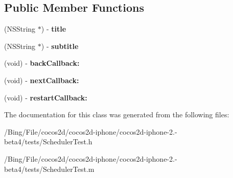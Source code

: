 \subsection*{Public Member Functions}
\begin{DoxyCompactItemize}
\item 
\hypertarget{interface_scheduler_test_aabbb968c6a8bc9c5c11ff99d73b4b0ab}{(N\-S\-String $\ast$) -\/ {\bfseries title}}\label{interface_scheduler_test_aabbb968c6a8bc9c5c11ff99d73b4b0ab}

\item 
\hypertarget{interface_scheduler_test_af3823d094f4a58d7d246365d0845bb3d}{(N\-S\-String $\ast$) -\/ {\bfseries subtitle}}\label{interface_scheduler_test_af3823d094f4a58d7d246365d0845bb3d}

\item 
\hypertarget{interface_scheduler_test_a55277727926c9a614cd544c8c8a390ec}{(void) -\/ {\bfseries back\-Callback\-:}}\label{interface_scheduler_test_a55277727926c9a614cd544c8c8a390ec}

\item 
\hypertarget{interface_scheduler_test_ae4f7a21ff0bb531cbb765f9d9c5111e3}{(void) -\/ {\bfseries next\-Callback\-:}}\label{interface_scheduler_test_ae4f7a21ff0bb531cbb765f9d9c5111e3}

\item 
\hypertarget{interface_scheduler_test_a278daaee1c62473d8c2417482b69b086}{(void) -\/ {\bfseries restart\-Callback\-:}}\label{interface_scheduler_test_a278daaee1c62473d8c2417482b69b086}

\end{DoxyCompactItemize}


The documentation for this class was generated from the following files\-:\begin{DoxyCompactItemize}
\item 
/\-Bing/\-File/cocos2d/cocos2d-\/iphone/cocos2d-\/iphone-\/2.-\/beta4/tests/Scheduler\-Test.\-h\item 
/\-Bing/\-File/cocos2d/cocos2d-\/iphone/cocos2d-\/iphone-\/2.-\/beta4/tests/Scheduler\-Test.\-m\end{DoxyCompactItemize}
